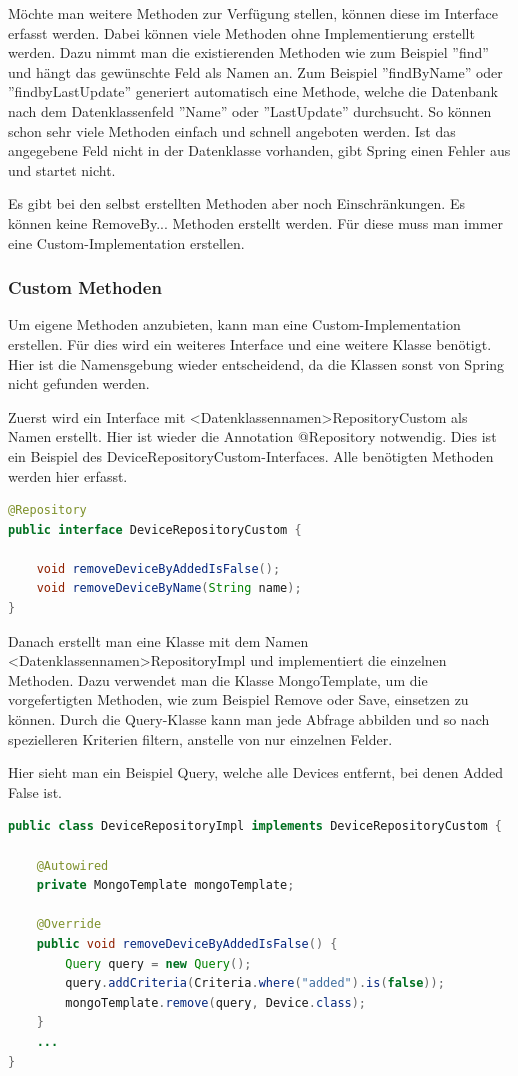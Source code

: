 Möchte man weitere Methoden zur Verfügung stellen, können diese im Interface erfasst werden. Dabei können viele Methoden ohne Implementierung erstellt werden. Dazu nimmt man die existierenden Methoden wie zum Beispiel ''find'' und hängt das gewünschte Feld als Namen an. Zum Beispiel ''findByName'' oder ''findbyLastUpdate'' generiert automatisch eine Methode, welche die Datenbank nach dem Datenklassenfeld ''Name'' oder ''LastUpdate'' durchsucht. So können schon sehr viele Methoden einfach und schnell angeboten werden. Ist das angegebene Feld nicht in der Datenklasse vorhanden, gibt Spring einen Fehler aus und startet nicht.

Es gibt bei den selbst erstellten Methoden aber noch Einschränkungen. Es können keine RemoveBy... Methoden erstellt werden. Für diese muss man immer eine Custom-Implementation erstellen.

\subsubsection{Custom Methoden}
Um eigene Methoden anzubieten, kann man eine Custom-Implementation erstellen. Für dies wird ein weiteres Interface und eine weitere Klasse benötigt. Hier ist die Namensgebung wieder entscheidend, da die Klassen sonst von Spring nicht gefunden werden.

Zuerst wird ein Interface mit <Datenklassennamen>RepositoryCustom als Namen erstellt. Hier ist wieder die Annotation @Repository notwendig. Dies ist ein Beispiel des DeviceRepositoryCustom-Interfaces. Alle benötigten Methoden werden hier erfasst.
\begin{lstlisting}[language=java]
@Repository
public interface DeviceRepositoryCustom {

	void removeDeviceByAddedIsFalse();
	void removeDeviceByName(String name);
}
\end{lstlisting}

Danach erstellt man eine Klasse mit dem Namen <Datenklassennamen>RepositoryImpl und implementiert die einzelnen Methoden. Dazu verwendet man die Klasse MongoTemplate, um die vorgefertigten Methoden, wie zum Beispiel Remove oder Save, einsetzen zu können. Durch die Query-Klasse kann man jede Abfrage abbilden und so nach spezielleren Kriterien filtern, anstelle von nur einzelnen Felder.

Hier sieht man ein Beispiel Query, welche alle Devices entfernt, bei denen Added False ist. 
\begin{lstlisting}[language=java]
public class DeviceRepositoryImpl implements DeviceRepositoryCustom {

	@Autowired
	private MongoTemplate mongoTemplate;

	@Override
	public void removeDeviceByAddedIsFalse() {
		Query query = new Query();
		query.addCriteria(Criteria.where("added").is(false));
		mongoTemplate.remove(query, Device.class);
	}
	...
}
\end{lstlisting}
